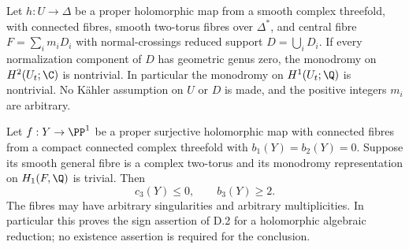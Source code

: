 \begin{proposition}\label{cdp:st:D.2.3}


Let $h:U\to\Delta$ be a proper holomorphic map from a smooth
complex threefold, with connected fibres, smooth two-torus fibres
over $\Delta^*$, and central fibre $F=\sum_i m_iD_i$ with
normal-crossings reduced support $D=\bigcup_iD_i$.
If every normalization component of $D$ has geometric genus zero,
the monodromy on $H^2(U_t;\C)$ is nontrivial. In particular the
monodromy on $H^1(U_t;\Q)$ is nontrivial. No K\"ahler assumption
on $U$ or $D$ is made, and the positive integers $m_i$ are arbitrary.
\end{proposition}

\begin{proposition}\label{cdp:st:D.2.5}


Let $f:Y\to\PP^1$ be a proper surjective holomorphic map with
connected fibres from a compact connected complex threefold with
$b_1(Y)=b_2(Y)=0$. Suppose its smooth general fibre is a complex
two-torus and its monodromy representation on $H_1(F,\Q)$ is
trivial. Then
\[
 c_3(Y)\le0,\qquad b_3(Y)\ge2.
 \tag{D.S.1}\label{cdp:eq:D.S.1}
\]
The fibres may have arbitrary singularities and arbitrary
multiplicities. In particular this proves the sign assertion of
D.2 for a holomorphic algebraic reduction; no existence assertion
is required for the conclusion.
\end{proposition}

